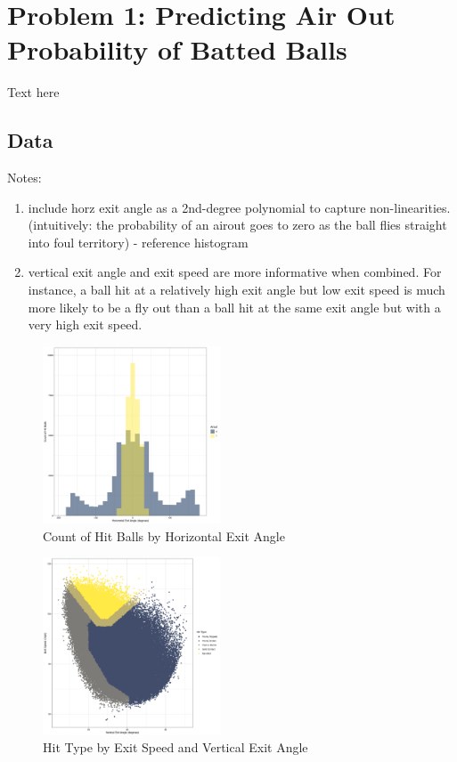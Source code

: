 
\section*{Problem 1: Predicting Air Out Probability of Batted Balls}
\label{sec:p1}

Text here

\subsection{Data}
\label{subsec:data}

Notes:
\begin{enumerate}
  \item include horz exit angle as a 2nd-degree polynomial to capture non-linearities. (intuitively: the probability of an airout goes to zero as the ball flies straight into foul territory) - reference histogram
  \item vertical exit angle and exit speed are more informative when combined. For instance, a ball hit at a relatively high exit angle but low exit speed is much more likely to be a fly out than a ball hit at the same exit angle but with a very high exit speed.
\end{enumerate}

\begin{figure}[htb]
  \includegraphics[width = 0.47\textwidth]{../../output/figs/horz_exit_angle_hist.png}
  \caption{Count of Hit Balls by Horizontal Exit Angle}
  \label{fig:hist}
\end{figure}

\begin{figure}[htb]
  \includegraphics[width = 0.47\textwidth]{../../output/figs/barrelled.png}
  \caption{Hit Type by Exit Speed and Vertical Exit Angle}
  \label{fig:barrelled}
\end{figure}

